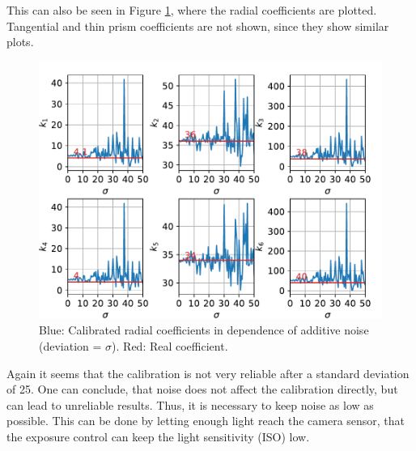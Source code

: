 This can also be seen in Figure \ref{development:noise_k}, where the radial coefficients are plotted.
Tangential and thin prism coefficients are not shown, since they show similar plots.
\begin{figure}
	\centering
	\includegraphics[width=0.9\linewidth]{3-development/calibration/images/noise_k.pdf}
	\caption{Blue: Calibrated radial coefficients in dependence of additive noise (deviation = $\sigma$). Red: Real coefficient.\label{development:noise_k}}
\end{figure}
Again it seems that the calibration is not very reliable after a standard deviation of 25.
One can conclude, that noise does not affect the calibration directly, but can lead to unreliable results.
Thus, it is necessary to keep noise as low as possible.
This can be done by letting enough light reach the camera sensor, that the exposure control can keep the light sensitivity (ISO) low.

